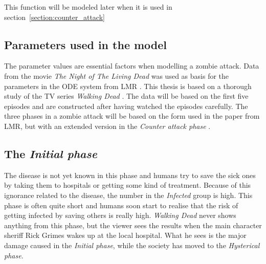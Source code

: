 \documentclass[%
twoside,                 %
final,                   %
chapterprefix=true,      %
open=right               %
10pt]{book}
\begin{document}
\noindent
This function will be modeled later when it is used in section~\ref{section:counter_attack}


\vspace{3mm}




\vspace{3mm}



\subsection{Parameters used in the model}
The parameter values are essential factors when modelling a zombie attack. Data from the movie \emph{The Night of The Living Dead} was used as basis for the parameters in the ODE system from LMR \cite{zombie-math}. This thesis is based on a thorough study of the TV series \emph{Walking Dead} \cite{walking_dead}. The data will be based on the first five episodes and are constructed after having watched the episodes carefully. The three phases in a zombie attack will be based on the form used in the paper from LMR, but with an extended version in the \emph{Counter attack phase} .

\subsection{The \emph{Initial phase}}
The disease is not yet known in this phase and humans try to save the sick ones by taking them to hospitals or getting some kind of treatment. Because of this ignorance related to the disease, the number in the \emph{Infected} group is high. This phase is often quite short and humans soon start to realise that the risk of getting infected by saving others is really high. \emph{Walking Dead} never shows anything from this phase, but the viewer sees the results when the main character sheriff Rick Grimes wakes up at the local hospital. What he sees is the major damage caused in the \emph{Initial phase}, while the society has moved to the \emph{Hysterical phase}.


\vspace{3mm}




\vspace{3mm}
\end{document}
